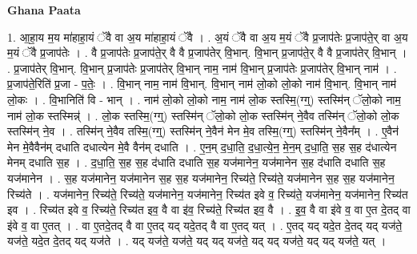 \documentclass[17pt]{extarticle}
\begin{document}
\textbf{Ghana Paata } \newline

1. आ॒हा॒य म॒य मा॑हाहा॒यं ॅवै वा अ॒य मा॑हाहा॒यं ॅवै । . अ॒यं ॅवै वा अ॒य म॒यं ॅवै प्र॒जाप॑तेः प्र॒जाप॑ते॒र् वा अ॒य म॒यं ॅवै प्र॒जाप॑तेः । . वै प्र॒जाप॑तेः प्र॒जाप॑ते॒र् वै वै प्र॒जाप॑तेर् वि॒भान्. वि॒भान् प्र॒जाप॑ते॒र् वै वै प्र॒जाप॑तेर् वि॒भान् । . प्र॒जाप॑तेर् वि॒भान्. वि॒भान् प्र॒जाप॑तेः प्र॒जाप॑तेर् वि॒भान् नाम॒ नाम॑ वि॒भान् प्र॒जाप॑तेः प्र॒जाप॑तेर् वि॒भान् नाम॑ । . प्र॒जाप॑ते॒रिति॑ प्र॒जा - प॒तेः॒ । . वि॒भान् नाम॒ नाम॑ वि॒भान्. वि॒भान् नाम॑ लो॒को लो॒को नाम॑ वि॒भान्. वि॒भान् नाम॑ लो॒कः । . वि॒भानिति॑ वि - भान् । . नाम॑ लो॒को लो॒को नाम॒ नाम॑ लो॒क स्तस्मि॒(ग्ग्॒) स्तस्मि॑न् ॅलो॒को नाम॒ नाम॑ लो॒क स्तस्मिन्न्॑ । . लो॒क स्तस्मि॒(ग्ग्॒) स्तस्मि॑न् ॅलो॒को लो॒क स्तस्मि॑न् ने॒वैव तस्मि॑न् ॅलो॒को लो॒क स्तस्मि॑न् ने॒व । . तस्मि॑न् ने॒वैव तस्मि॒(ग्ग्॒) स्तस्मि॑न् ने॒वैन॑ मेन मे॒व तस्मि॒(ग्ग्॒) स्तस्मि॑न् ने॒वैन᳚म् । . ए॒वैन॑ मेन मे॒वैवैन॑म् दधाति दधात्येन मे॒वै वैन॑म् दधाति । . ए॒न॒म् द॒धा॒ति॒ द॒धा॒त्ये॒न॒ मे॒न॒म् द॒धा॒ति॒ स॒ह स॒ह द॑धात्येन मेनम् दधाति स॒ह । . द॒धा॒ति॒ स॒ह स॒ह द॑धाति दधाति स॒ह यज॑मानेन॒ यज॑मानेन स॒ह द॑धाति दधाति स॒ह यज॑मानेन । . स॒ह यज॑मानेन॒ यज॑मानेन स॒ह स॒ह यज॑मानेन॒ रिच्य॑ते॒ रिच्य॑ते॒ यज॑मानेन स॒ह स॒ह यज॑मानेन॒ रिच्य॑ते । . यज॑मानेन॒ रिच्य॑ते॒ रिच्य॑ते॒ यज॑मानेन॒ यज॑मानेन॒ रिच्य॑त इवे व॒ रिच्य॑ते॒ यज॑मानेन॒ यज॑मानेन॒ रिच्य॑त इव । . रिच्य॑त इवे व॒ रिच्य॑ते॒ रिच्य॑त इव॒ वै वा इ॑व॒ रिच्य॑ते॒ रिच्य॑त इव॒ वै । . इ॒व॒ वै वा इ॑वे व॒ वा ए॒त दे॒तद् वा इ॑वे व॒ वा ए॒तत् । . वा ए॒तदे॒तद् वै वा ए॒तद् यद् यदे॒तद् वै वा ए॒तद् यत् । . ए॒तद् यद् यदे॒त दे॒तद् यद् यज॑ते॒ यज॑ते॒ यदे॒त दे॒तद् यद् यज॑ते । . यद् यज॑ते॒ यज॑ते॒ यद् यद् यज॑ते॒ यद् यद् यज॑ते॒ यद् यद् यज॑ते॒ यत् । \newline
\end{document}

